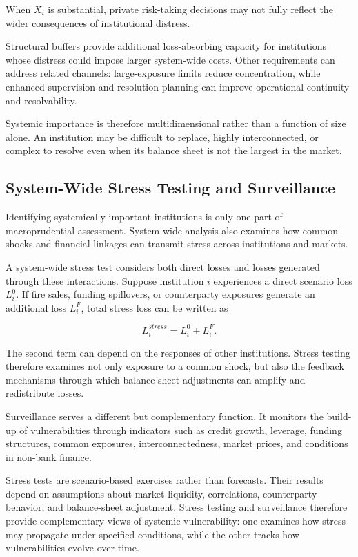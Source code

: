 When \(X_i\) is substantial, private risk-taking decisions may not fully reflect the wider consequences of institutional distress.

Structural buffers provide additional loss-absorbing capacity for institutions whose distress could impose larger system-wide costs. Other requirements can address related channels: large-exposure limits reduce concentration, while enhanced supervision and resolution planning can improve operational continuity and resolvability.

Systemic importance is therefore multidimensional rather than a function of size alone. An institution may be difficult to replace, highly interconnected, or complex to resolve even when its balance sheet is not the largest in the market.

\subsection{System-Wide Stress Testing and Surveillance}

Identifying systemically important institutions is only one part of macroprudential assessment. System-wide analysis also examines how common shocks and financial linkages can transmit stress across institutions and markets.

A system-wide stress test considers both direct losses and losses generated through these interactions. Suppose institution \(i\) experiences a direct scenario loss \(L_i^{0}\). If fire sales, funding spillovers, or counterparty exposures generate an additional loss \(L_i^{F}\), total stress loss can be written as

\begin{equation}
L_i^{stress}
=L_i^{0}+L_i^{F}.
\label{eq:ch23-system-stress-loss}
\end{equation}

The second term can depend on the responses of other institutions. Stress testing therefore examines not only exposure to a common shock, but also the feedback mechanisms through which balance-sheet adjustments can amplify and redistribute losses.

Surveillance serves a different but complementary function. It monitors the build-up of vulnerabilities through indicators such as credit growth, leverage, funding structures, common exposures, interconnectedness, market prices, and conditions in non-bank finance.

Stress tests are scenario-based exercises rather than forecasts. Their results depend on assumptions about market liquidity, correlations, counterparty behavior, and balance-sheet adjustment. Stress testing and surveillance therefore provide complementary views of systemic vulnerability: one examines how stress may propagate under specified conditions, while the other tracks how vulnerabilities evolve over time.

